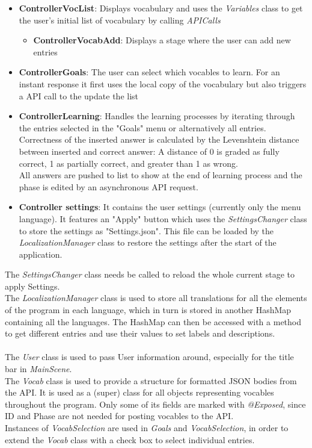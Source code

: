 \begin{itemize}
    \item \textbf{ControllerVocList}: Displays vocabulary and uses the \textit{Variables} class to get the user's initial list of vocabulary by calling \textit{APICalls} 
    \begin{itemize}
        \item \textbf{ControllerVocabAdd}: Displays a stage where the user can add new entries
    \end{itemize}
    \item \textbf{ControllerGoals}: The user can select which vocables to learn. For an instant response it first uses the local copy of the vocabulary but also triggers a API call to the update the list
    \item \textbf{ControllerLearning}: Handles the learning processes by iterating through the entries selected in the "Goals" menu or alternatively all entries. Correctness of the inserted answer is calculated by the Levenshtein distance between inserted and correct answer: A distance of 0 is graded as fully correct, 1 as partially correct, and greater than 1 as wrong. \\ 
    All answers are pushed to list to show at the end of learning process and the phase is edited by an asynchronous API request.
    \item \textbf{Controller settings}: It contains the user settings (currently only the menu language). It features an "Apply" button which uses the \textit{SettingsChanger} class to store the settings as "Settings.json". This file can be loaded by the \textit{LocalizationManager} class to restore the settings after the start of the application.
\end{itemize}
The \textit{SettingsChanger} class needs be called to reload the whole current stage to apply Settings.\\
The \textit{LocalizationManager} class is used to store all translations for all the elements of the program in each language, which in turn is stored in another HashMap containing all the languages.
The HashMap can then be accessed with a method to get different entries and use their values to set labels and descriptions.\\
\\
The \textit{User} class is used to pass User information around, especially for the title bar in \textit{MainScene}.\\
The \textit{Vocab} class is used to provide a structure for formatted JSON bodies from the API. It is used as a (super) class for all objects representing vocables throughout the program. Only some of its fields are marked with \textit{ @Exposed}, since ID and Phase are not needed for posting vocables to the API.\\
Instances of \textit{VocabSelection} are used in \textit{Goals} and \textit{VocabSelection}, in order to extend the \textit{Vocab} class with a check box to select individual entries.

